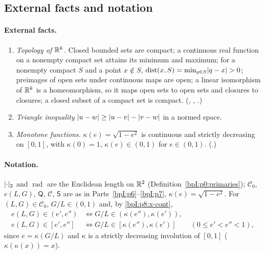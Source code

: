 \subsection{External facts and notation}\label{bpI:p8:sec-ext}

\paragraph{External facts.}
{\raggedright
\begin{enumerate}[label=(Y\arabic*),ref=(Y\arabic*)]
\item\label{bpI:p8:x-topo} \emph{Topology of $\mathbb{R}^k$.} Closed bounded sets are compact; a continuous real function on a nonempty compact set attains its minimum and maximum;
  for a nonempty compact $S$ and a point $x\notin S$, $\operatorname{dist}(x,S)=\min_{q\in S}\lvert q-x\rvert>0$; preimages of open sets under continuous maps are open;
  a linear isomorphism of $\mathbb{R}^k$ is a homeomorphism, so it maps open sets to open sets and closures to closures; a closed subset of a compact set is compact.
  (, , .)
\item\label{bpI:p8:x-norm} \emph{Triangle inequality} $\lvert u-w\rvert\ge\lvert u-v\rvert-\lvert v-w\rvert$ in a normed space.
\item\label{bpI:p8:x-cont} \emph{Monotone functions.} $\kappa(e)=\sqrt{1-e^2}$ is continuous and strictly decreasing on $[0,1]$, with $\kappa(0)=1$, $\kappa(e)\in(0,1)$ for $e\in(0,1)$. (.)
\end{enumerate}\par}

\paragraph{Notation.} $\lvert \cdot\rvert_2$ and $\operatorname{rad}$ are the Euclidean length on $\mathbb{R}^2$ (Definition~\ref{bpI:p0:primaries}); $\mathcal C_0$, $e(L,G)$, $\mathsf Q$, $\mathcal C$, $\mathsf S$ are as in Parts~\ref{bpI:p6}--\ref{bpI:p7},
$\kappa(e)=\sqrt{1-e^2}$. For $(L,G)\in\mathcal C_0$, $G/L\in(0,1)$ and, by \ref{bpI:p8:x-cont},
\begin{equation}\label{bpI:p8:e-vs-k}
\begin{aligned}
e(L,G)\in(e',e'')&\iff G/L\in(\kappa(e''),\kappa(e')),\\
e(L,G)\in[e',e'']&\iff G/L\in[\kappa(e''),\kappa(e')]\qquad(0\le e'<e''<1),
\end{aligned}
\end{equation}
since $e=\kappa(G/L)$ and $\kappa$ is a strictly decreasing involution of $[0,1]$ ($\kappa(\kappa(x))=x$).

